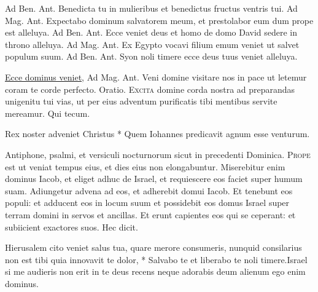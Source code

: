 \begin{multicols*}{2}
 {\color{Red} Ad Ben. Ant.} Benedicta tu in mulieribus et benedictus fructus ventris tui. {\color{Red} Ad Mag. Ant.} Expectabo dominum salvatorem meum, et prestolabor eum dum prope est alleluya.
 {\color{Red} Ad Ben. Ant.} Ecce veniet deus et homo de domo David sedere in throno alleluya. {\color{Red} Ad Mag. Ant.} Ex Egypto vocavi filium emum veniet ut salvet populum suum.
 {\color{Red} Ad Ben. Ant.} Syon noli timere ecce deus tuus veniet alleluya.
{\color{Red} }
\par {} \R \hyperlink{ecce-dominus-veniet}{Ecce dominus veniet}, {\color{Red} Ad Mag. Ant.} Veni domine visitare nos in pace ut letemur coram te corde perfecto. {\color{Red} Oratio.}
\lettrine[lines=2]{\zallmancaps \color{Red} E}{xcita} domine corda nostra ad preparandas unigenitu tui vias, ut per eius adventum purificatis tibi mentibus servite mereamur. Qui tecum.
\begin{invitatory}
{Rex noster adveniet Christus * Quem Iohannes predicavit agnum esse venturum.}
\end{invitatory}
Antiphone, psalmi, et versiculi nocturnorum sicut in precedenti Dominica.
\lettrine[lines=2]{\zallmancaps \color{Blue} P}{rope} est ut veniat tempus eius, et dies eius non elongabuntur. Miserebitur enim dominus Iacob, et eliget adhuc de Israel, et requiescere eos faciet super humum suam. Adiungetur advena ad eos, et adherebit domui Iacob. Et tenebunt eos populi: et adducent eos in locum suum et possidebit eos domus Israel super terram domini in servos et ancillas. Et erunt capientes eos qui se ceperant: et subiicient exactores suos. Hec dicit.
\begin{responsory}
{Hierusalem cito veniet salus tua, quare merore consumeris, nunquid consilarius non est tibi quia innovavit te dolor, * Salvabo te et liberabo te noli timere.}{Israel si me audieris non erit in te deus recens neque adorabis deum alienum ego enim dominus.}
\end{responsory}

\end{multicols*}
